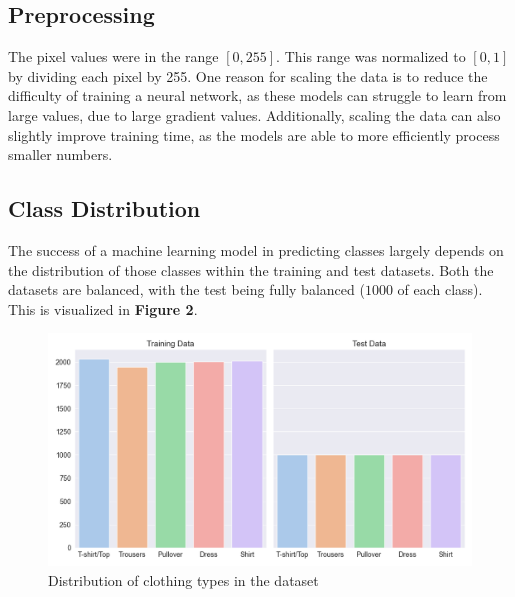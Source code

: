 \subsection{Preprocessing}\label{subsec:preprocessing}
The pixel values were in the range $[0, 255]$.
This range was normalized to $[0, 1]$ by dividing each pixel by 255.
One reason for scaling the data is to reduce the difficulty of training a neural network, as these models can struggle to learn from large values, due to large gradient values.
Additionally, scaling the data can also slightly improve training time, as the models are able to more efficiently process smaller numbers.
\subsection{Class Distribution}\label{subsec:class-distribution}
The success of a machine learning model in predicting classes largely depends on the distribution of those classes within the training and test datasets.
Both the datasets are balanced, with the test being fully balanced ($1000$ of each class).
This is visualized in \textbf{Figure 2}.
\begin{figure}[ht]
\centering
\includegraphics[scale=0.45]{figures_for_report/class_distribution}
\captionsetup{justification=centering,margin=2cm}
\caption{Distribution of clothing types in the dataset}\label{fig:figure2}
\end{figure}

